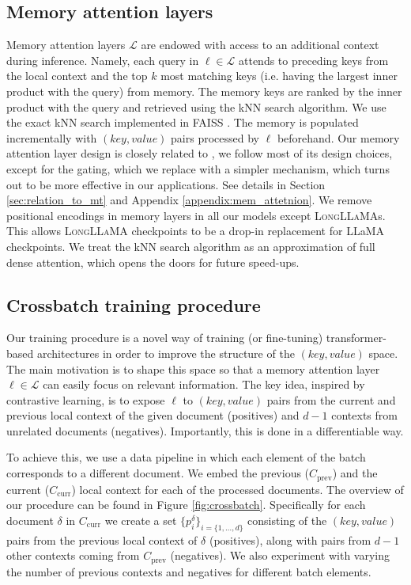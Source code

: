 \subsection{Memory attention layers}\label{subs:RetrievalAugmentation}
Memory attention layers $\mathcal{L}$ are endowed with access to an additional context during inference. Namely, each query in $\ell\in \mathcal{L}$ attends to preceding keys from the local context and the top $k$ most matching keys (i.e. having the largest inner product with the query) from memory. The memory keys are ranked by the inner product with the query and retrieved using the kNN search algorithm.  We use the exact kNN search implemented in FAISS \citep{faiss_johnson2017billionscale}. The memory is populated incrementally with $(key, value)$ pairs processed by $\ell$ beforehand. Our memory attention layer design is closely related to \citep{wu2022memorizing}, we follow most of its design choices, except for the gating, which we replace with a simpler mechanism, which turns out to be more effective in our applications. See details in Section \ref{sec:relation_to_mt} and  Appendix \ref{appendix:mem_attetnion}. 
We remove positional encodings in memory layers in all our models except \textsc{LongLLaMA}s. This allows \textsc{LongLLaMA} checkpoints to be a drop-in replacement for LLaMA checkpoints. {We treat the kNN search algorithm as an approximation of full dense attention, which opens the doors for future speed-ups.}

\subsection{Crossbatch training procedure} \label{sec:training_procedure}

Our  training procedure is a novel way of training (or fine-tuning) transformer-based architectures in order to improve the structure of the $(key, value)$ space. The main motivation is to shape this space so that a memory attention layer $\ell \in \mathcal{L}$ can easily focus on relevant information. The key idea, inspired by contrastive learning, is to expose $\ell$ to $(key, value)$ pairs from the current and previous local context of the given document (positives) and $d-1$ contexts from unrelated documents (negatives). Importantly, this is done in a differentiable way.

To achieve this, we use a data pipeline in which each element of the batch corresponds to a different document. We embed the previous ($C_{\mathrm{prev}}$) and the current ($C_{\mathrm{curr}}$) local context for each of the processed documents. The overview of our procedure can be found in Figure \ref{fig:crossbatch}. Specifically for each document $\delta$ in $C_{\mathrm{curr}}$ we create a set $\{p^\delta_i\}_{i=\{1, \ldots, d\}}$  consisting of the $(key, value)$ pairs from the previous local context of $\delta$ (positives), along with pairs from $d-1$ other contexts coming from $C_{\mathrm{prev}}$ (negatives). We also experiment with varying the number of previous contexts and negatives for different batch elements.

